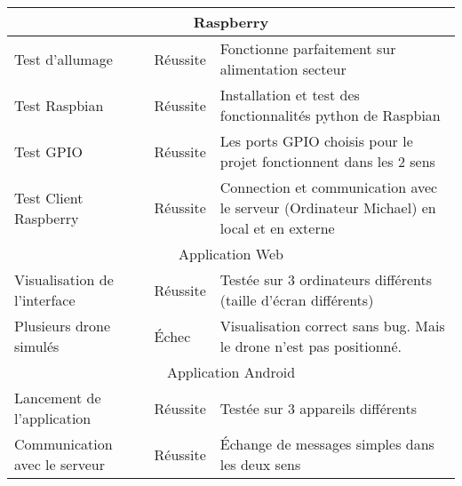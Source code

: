\begin{tabular}{|p{}  |m{}  |p{} |}	
\hline
\multicolumn{3}{|c|}{Raspberry}\\ \hline
Test d'allumage & Réussite & Fonctionne parfaitement sur alimentation secteur \\
\hline
Test Raspbian & Réussite & Installation et test des fonctionnalités python de Raspbian \\ 
\hline
Test GPIO & Réussite & Les ports GPIO choisis pour le projet fonctionnent dans les 2 sens \\
\hline
Test Client Raspberry & Réussite & Connection et communication avec le serveur (Ordinateur Michael) en local et en externe \\
\hline
\multicolumn{3}{|c|}{Application Web}\\ \hline
Visualisation de l'interface & Réussite & Testée sur 3 ordinateurs différents (taille d'écran différents) \\
\hline
Plusieurs drone simulés & Échec & Visualisation correct sans bug. Mais le drone n'est pas positionné. \\
\hline
\multicolumn{3}{|c|}{Application Android}\\ \hline
Lancement de l'application & Réussite & Testée sur 3 appareils différents \\
\hline
Communication avec le serveur & Réussite & Échange de messages simples dans les deux sens \\
\hline

\end{tabular}
